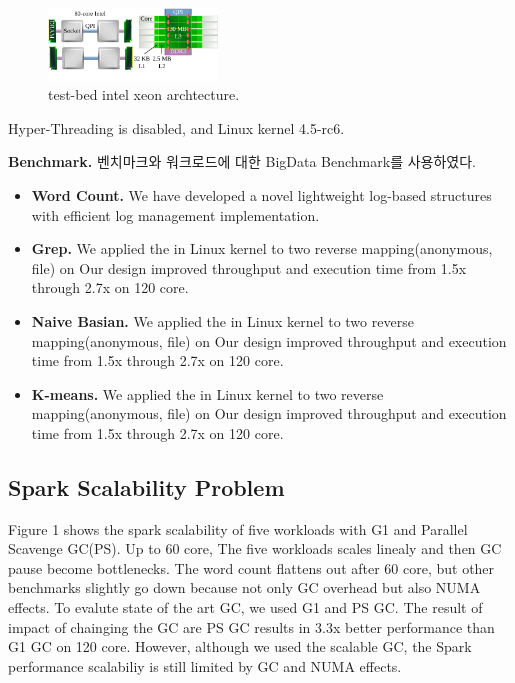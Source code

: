 \begin{figure}[h]
  \begin{center}
     \includegraphics[width=0.4\textwidth]{fig/xeon}
  \end{center}
  \caption{test-bed intel xeon archtecture.}
  \label{fig:basic}
\end{figure}
Hyper-Threading is disabled, and Linux kernel 4.5-rc6.
\else

\fi

\ifkor
\noindent
\textbf{Benchmark.} 벤치마크와 워크로드에 대한 BigData Benchmark를 사용하였다.
\begin{itemize}
\item \textbf{Word Count. }We have developed a novel lightweight log-based
structures with efficient log management implementation.
\item \textbf{Grep. }
We applied the in Linux kernel to two reverse mapping(anonymous, file) on
Our design improved throughput and execution time from 1.5x through 2.7x on 120 core.
\item \textbf{Naive Basian. }
We applied the in Linux kernel to two reverse mapping(anonymous, file) on
Our design improved throughput and execution time from 1.5x through 2.7x on 120 core.
\item \textbf{K-means.}
We applied the in Linux kernel to two reverse mapping(anonymous, file) on
Our design improved throughput and execution time from 1.5x through 2.7x on 120 core.
\end{itemize}
\else

\fi


\subsection{Spark Scalability Problem}
\ifkor
Figure 1 shows the spark scalability of five workloads with G1 and Parallel
Scavenge GC(PS).
Up to 60 core, The five workloads scales linealy and then GC pause become
bottlenecks.
The word count flattens out after 60 core, but other benchmarks slightly go
down because not only GC overhead but also NUMA effects. 
To evalute state of the art GC, we used G1 and PS GC.
The result of impact of chainging the GC are PS GC results in 3.3x better
performance than G1 GC on 120 core.
However, although we used the scalable GC, the Spark performance scalabiliy is
still limited by GC and NUMA effects.
\else

